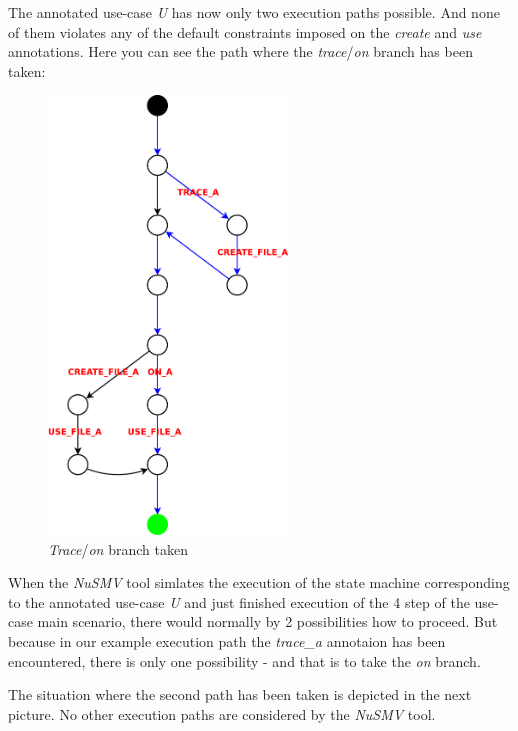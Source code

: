 The annotated use-case \emph{U} has now only two execution paths possible. And none of them violates any of the default constraints
imposed on the \emph{create} and \emph{use} annotations. Here you can see the path where the \emph{trace}/\emph{on} branch has been
taken:

\begin{figure}[ht]
  \centering
  \includegraphics[width=180pt]{images/traceTest_path_taken}
  \caption{\emph{Trace}/\emph{on} branch taken}
  \label{fig:traceTestTaken}
\end{figure}

When the \emph{NuSMV} tool simlates the execution of the state machine corresponding to the annotated use-case \emph{U} and just finished
execution of the 4 step of the use-case main scenario, there would normally by 2 possibilities how to proceed. But because in our
example execution path the \emph{trace\_a} annotaion has been encountered, there is only one possibility - and that is to take the
\emph{on} branch.

\newpage

The situation where the second path has been taken is depicted in the next picture. No other execution paths are considered by the
\emph{NuSMV} tool.

